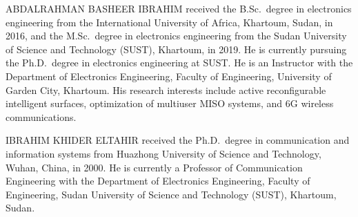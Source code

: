 \documentclass{ieeeaccess}
\begin{document}
\begin{IEEEbiographynophoto}{ABDALRAHMAN BASHEER IBRAHIM}
received the B.Sc.\ degree in electronics engineering from the International University of Africa, Khartoum, Sudan, in 2016, and the M.Sc.\ degree in electronics engineering from the Sudan University of Science and Technology (SUST), Khartoum, in 2019. He is currently pursuing the Ph.D.\ degree in electronics engineering at SUST. He is an Instructor with the Department of Electronics Engineering, Faculty of Engineering, University of Garden City, Khartoum. His research interests include active reconfigurable intelligent surfaces, optimization of multiuser MISO systems, and 6G wireless communications.
\end{IEEEbiographynophoto}

\begin{IEEEbiographynophoto}{IBRAHIM KHIDER ELTAHIR}
received the Ph.D.\ degree in communication and information systems from Huazhong University of Science and Technology, Wuhan, China, in 2000. He is currently a Professor of Communication Engineering with the Department of Electronics Engineering, Faculty of Engineering, Sudan University of Science and Technology (SUST), Khartoum, Sudan.
\end{IEEEbiographynophoto}

\EOD
\end{document}
